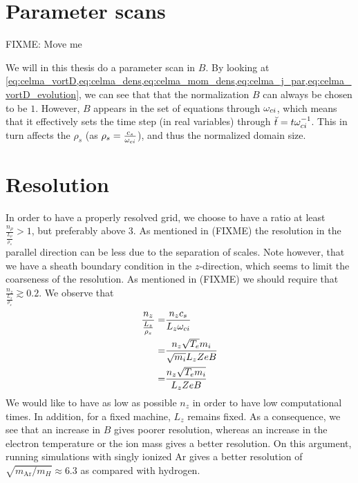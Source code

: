 \section{Parameter scans}
FIXME: Move me

%
We will in this thesis do a parameter scan in $B$.
By looking at \cref{eq:celma_vortD,eq:celma_dens,eq:celma_mom_dens,eq:celma_j_par,eq:celma_vortD_evolution}, we can see that that the normalization $B$ can always be chosen to be $1$.
However, $B$ appears in the set of equations through $\omega_{ci}$, which means that it effectively sets the time step (in real variables) through $\breve{t}=t\omega_{ci}^{-1}$.
This in turn affects the $\rho_s$ (as $\rho_s=\frac{c_s}{\omega_{ci}}$), and thus the normalized domain size.

\section{Resolution}
\label{sec:resolution}
%
In order to have a properly resolved grid, we choose to have a ratio at least $\frac{n_\rho}{\frac{L_\rho}{\rho_s}}>1$, but preferably above  $3$.
As mentioned in (FIXME)
the resolution in the parallel direction can be less due to the separation of scales.
Note however, that we have a sheath boundary condition in the $z$-direction, which seems to limit the coarseness of the resolution.
As mentioned in (FIXME)
we should require that $\frac{n_z}{\frac{L_z}{\rho_s}}\gtrsim0.2$.
We observe that
%
\begin{align*}
    \frac{n_z}{\frac{L_z}{\rho_s}}
    =& \frac{n_zc_s}{L_z \omega_{ci}}
    \\
    =& \frac{n_z\sqrt{T_e}m_i}{\sqrt{m_i} L_z ZeB}
    \\
    =& \frac{n_z\sqrt{T_em_i}}{L_z ZeB}
\end{align*}
%
We would like to have as low as possible $n_z$ in order to have low computational times.
In addition, for a fixed machine, $L_z$ remains fixed.
As a consequence, we see that an increase in $B$ gives poorer resolution, whereas an increase in the electron temperature or the ion mass gives a better resolution.
On this argument, running simulations with singly ionized Ar gives a better resolution of $\sqrt{m_{\text{Ar}}/m_H}\approx6.3$ as compared with hydrogen.
